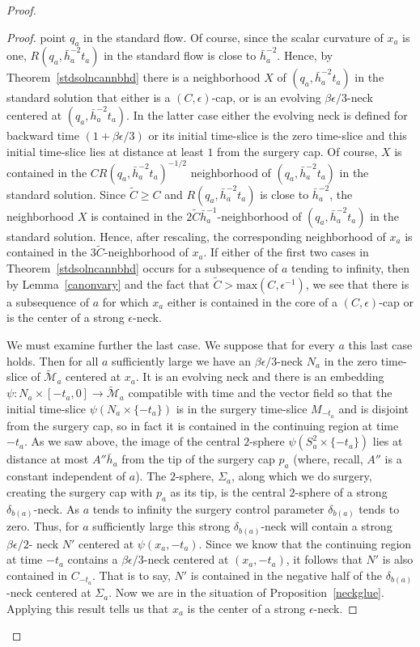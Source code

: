 \begin{proof}
\begin{proof}
point $q_a$ in the standard flow. Of course, since the scalar
curvature of $x_a$ is one,  $R(q_a,\bar h_a^{-2}t_a)$ in the standard flow is
close to $\bar h_a^{-2}$. Hence, by Theorem~\ref{stdsolncannbhd}
there is a neighborhood $X$ of $(q_a,\bar h_a^{-2}t_a)$ in the standard solution
that either is a $(C,\epsilon)$-cap, or is an evolving
$\beta\epsilon/3$-neck centered at $(q_a,\bar h_a^{-2}t_a)$. In the latter case
either the evolving neck is defined for backward time
$(1+\beta\epsilon/3)$ or its initial time-slice is the zero
time-slice and this initial time-slice lies at distance at least $1$
from the surgery cap. Of course, $X$ is contained in the
$CR(q_a,\bar h_a^{-2}t_a)^{-1/2}$ neighborhood of $(q_a,\bar h_a^{-2}t_a)$ in the standard
solution. Since $\widetilde C\ge C$ and $R(q_a,\bar h_a^{-2}t_a)$ is close to
$\bar h_a^{-2}$, the neighborhood $X$ is contained in the
$2\widetilde C\bar h_a^{-1}$-neighborhood of $(q_a,\bar h_a^{-2}t_a)$ in the
standard solution.  Hence, after rescaling, the corresponding
neighborhood of $x_a$ is contained in the $3\widetilde
C$-neighborhood of $x_a$. If either of the first two cases in Theorem~\ref{stdsolncannbhd} occurs
for a subsequence of $a$ tending to infinity, then  by
Lemma~\ref{canonvary} and the fact that $\widetilde C>\mathrm{max}(C,\epsilon^{-1})$, we see that there is a subsequence of $a$
for which $x_a$ either is contained in the core of a
$(C,\epsilon)$-cap or is the center of a strong $\epsilon$-neck.

We must examine further the last case. We suppose that for every $a$
this last case holds. Then for all $a$ sufficiently large we have an
$\beta\epsilon/3$-neck $N_a$ in the zero time-slice of $\widetilde{\mathcal
M}_a$ centered at $x_a$. It is an evolving neck and there is an
embedding $\psi\colon N_a\times [-t_a,0]\to \widetilde{\mathcal
M}_a$ compatible with time and the vector field so that the initial
time-slice $\psi(N_a\times \{-t_a\})$ is in the surgery time-slice
$M_{-t_a}$ and is disjoint from the surgery cap, so in fact it is
contained in the continuing region at time $-t_a$. As we saw above,
the image of the central $2$-sphere $\psi(S^2_a\times\{-t_a\})$ lies
at distance at most  $ A''\bar h_a$ from the tip of the surgery cap
$p_a$ (where, recall, $A''$ is a constant independent of $a$). The
$2$-sphere, $\Sigma_a$, along which we do surgery,   creating the surgery
cap with $p_a$ as its tip, is the central $2$-sphere of a strong
$\delta_{b(a)}$-neck. As $a$ tends to infinity the surgery control
parameter $\delta_{b(a)}$ tends to zero. Thus, for $a$ sufficiently
large this strong $\delta_{b(a)}$-neck will contain a strong
$\beta\epsilon/2$- neck $N'$ centered at $\psi(x_a,-t_a)$. Since we
know that the continuing region at time $-t_a$ contains a
$\beta\epsilon/3$-neck centered at $(x_a,-t_a)$, it follows that
$N'$ is also contained in $C_{-t_a}$. That is to say, $N'$  is
contained in the negative half of the $\delta_{b(a)}$-neck centered
at $\Sigma_a$. Now we are in the situation of
Proposition~\ref{neckglue}. Applying this result tells us that $x_a$
is the center of a strong $\epsilon$-neck.


\end{proof}
\end{proof}
